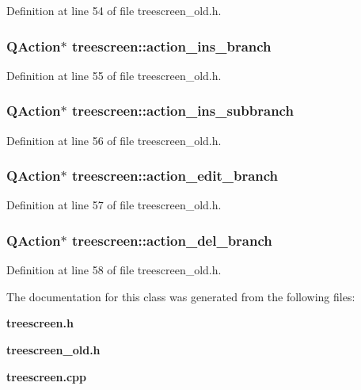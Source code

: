 Definition at line 54 of file treescreen\_\-old.h.
\subsubsection{\setlength{\rightskip}{0pt plus 5cm}QAction$\ast$ {\bf treescreen::action\_\-ins\_\-branch}\hspace{0.3cm}{\tt  [private]}}\label{classtreescreen_ab5ee2502a63997e608205efaeb79225}




Definition at line 55 of file treescreen\_\-old.h.
\subsubsection{\setlength{\rightskip}{0pt plus 5cm}QAction$\ast$ {\bf treescreen::action\_\-ins\_\-subbranch}\hspace{0.3cm}{\tt  [private]}}\label{classtreescreen_90bf91aa0d3b10da86514f53d8b826b1}




Definition at line 56 of file treescreen\_\-old.h.
\subsubsection{\setlength{\rightskip}{0pt plus 5cm}QAction$\ast$ {\bf treescreen::action\_\-edit\_\-branch}\hspace{0.3cm}{\tt  [private]}}\label{classtreescreen_5b276116c7d715ff363b3ff93279e26d}




Definition at line 57 of file treescreen\_\-old.h.
\subsubsection{\setlength{\rightskip}{0pt plus 5cm}QAction$\ast$ {\bf treescreen::action\_\-del\_\-branch}\hspace{0.3cm}{\tt  [private]}}\label{classtreescreen_723ef6926d4df31046a826ba3463546c}




Definition at line 58 of file treescreen\_\-old.h.

The documentation for this class was generated from the following files:\begin{CompactItemize}
\item 
{\bf treescreen.h}\item 
{\bf treescreen\_\-old.h}\item 
{\bf treescreen.cpp}\end{CompactItemize}
